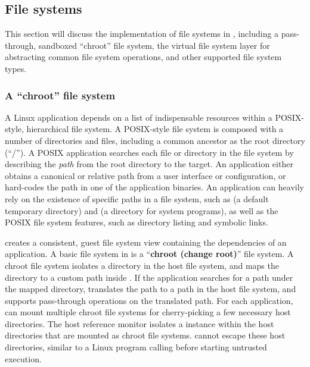 \subsection{File systems}
\label{sec:libos:fs}

This section will discuss the implementation of file systems in \thelibos{}, including a pass-through, sandboxed ``chroot'' file system, the virtual file system layer for abstracting common file system operations, and other supported file system types.


\subsubsection{A ``chroot'' file system}


A Linux application depends on a list of indispensable resources
within a POSIX-style, hierarchical file system.
A POSIX-style file system is composed with a number of directories and files, including a common ancestor as the root directory (``/'').
A POSIX application searches each file or directory in the file system
by describing the {\em path} %
from the root directory to the target. %
An application either obtains a canonical or relative path
from a user interface or configuration,
or hard-codes the path in one of the application binaries.
An application can heavily rely on the existence of specific paths in a file system,
such as  (a default temporary directory)
and  (a directory for system programs),
as well as the POSIX file system features,
such as directory listing and symbolic links.



\thelibos{} creates a consistent, guest file system view containing the dependencies of an application.
A basic file system in \thelibos{} is a ``{\bf chroot (change root)}'' file system.
A chroot file system isolates a directory in the host file system,
and maps the directory
to a custom path inside \thelibos{}.
If the application searches for a path under the mapped directory,
\thelibos{} translates the path to a path in the host file system, and supports pass-through operations on the translated path.
For each application,
\thelibos{} can mount multiple chroot file systems for cherry-picking a few necessary host directories.
The host reference monitor isolates
a \thelibos{} instance within the host directories that are mounted as chroot file systems.
\thelibos{} cannot escape these host directories,
similar to a Linux program calling  before starting untrusted execution.


